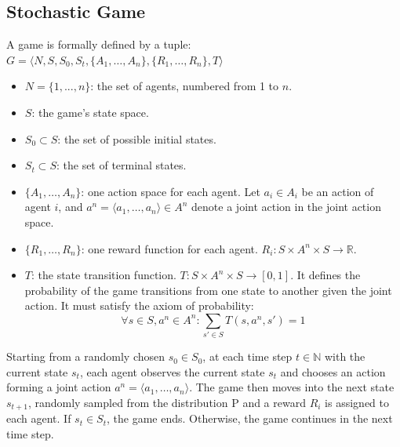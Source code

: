 \documentclass[]{interact}
\theoremstyle{plain}%
\theoremstyle{definition}
\theoremstyle{remark}
\begin{document}
\subsection{Stochastic Game}
A game is formally defined by a tuple:
$G = \langle N,S,S_0,S_t,\{A_1,\ldots,A_n\},\{R_1,\ldots,R_n\},T \rangle$
\begin{itemize}
    \item $N = \{1, ..., n\}$: the set of agents, numbered from 1 to $n$.
    \item $S$: the game’s state space.
    \item $S_0 \subset S$: the set of possible initial states.
    \item $S_t \subset S$: the set of terminal states.
    \item $\{A_1,\ldots,A_n\}$: one action space for each agent. Let $a_i \in A_i$ be an action of agent $i$, and $a^n=\langle a_1,\ldots,a_n \rangle \in A^n$ denote a joint action in the joint action space.
    \item $\{R_1,\ldots,R_n\}$: one reward function for each agent. $R_i:S \times A^n \times S \rightarrow \mathbb{R}$.
    \item $T$: the state transition function. $T:S \times A^n \times S \rightarrow [0,1]$. It defines the probability of the game transitions from one state to another given the joint action. It must satisfy the axiom of probability:
    \begin{equation}
        \forall s \in S,a^n \in A^n: \sum_{s' \in S}{T(s,a^n,s')}=1
        \label{eq:state_transition}
    \end{equation}
\end{itemize}
Starting from a randomly chosen $s_0 \in S_0$, at each time step $t \in \mathbb{N}$ with the current state $s_t$, each agent observes the current state $s_t$ and chooses an action forming a joint action $a^n=\langle a_1,\ldots,a_n \rangle$. The game then moves into the next state $s_{t+1}$, randomly sampled from the distribution P and a reward $R_i$ is assigned to each agent. If $s_t \in S_t$, the game ends. Otherwise, the game continues in the next time step.
\end{document}
